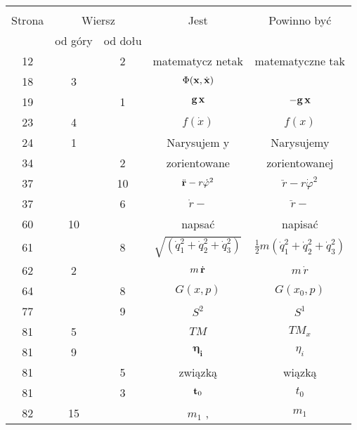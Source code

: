 \documentclass[a4paper,11pt]{article}
\begin{document}
\begin{center}

  \begin{tabular}{|c|c|c|c|c|}
    \hline
    & \multicolumn{2}{c|}{} & & \\
    Strona & \multicolumn{2}{c|}{Wiersz} & Jest
                              & Powinno być \\ \cline{2-3}
    & od góry & od dołu & & \\
    \hline
    12  & &  2 & matematycz netak & matematyczne tak \\
    18  &  3 & & $\Phi( \mathbf{x}, \dot{ \mathbf{x} } )$
           & %
    \\
    19  & &  1 & $\mathbf{g}\, \mathbf{x}$ & $-\mathbf{g}\, \mathbf{x}$ \\
    23  &  4 & & $f( \dot{ x } )$ & $f( x )$ \\
    24  &  1 & & Narysujem y & Narysujemy \\
    34  & &  2 & zorientowane & zorientowanej \\
    37  & & 10 & $\ddot{ \mathbf{r} } - r \dot{ \varphi }^{ 2 }$
           & $\ddot{ r } - r \dot{ \varphi }^{ 2 }$ \\
    37  & &  6 & $\dot{ r } -$ & $\ddot{ r } -$ \\
    60  & 10 & & napsać & napisać \\
    61  & &  8 & $\sqrt{ ( \dot{ q }_{ 1 }^{ 2 } + \dot{ q }_{ 2 }^{ 2 }
                 + \dot{ q }_{ 3 }^{ 2 } ) }$
           & $\frac{ 1 }{ 2 } m ( \dot{ q }_{ 1 }^{ 2 } + \dot{ q }_{ 2 }^{ 2 }
             + \dot{ q }_{ 3 }^{ 2 } )$ \\
    62  &  2 & & $m\, \dot{ \mathbf{r} }$ & $m\, \dot{ r }$ \\
    64  & &  8 & $G( x, p )$ & $G( x_{ 0 }, p )$ \\
    77  & &  9 & $S^{ 2 }$ & $S^{ 1 }$ \\
    81  &  5 & & $TM$ & $TM_{ x }$ \\
    81  &  9 & & $\mathbf{ \eta_{ i } }$ & $\eta_{ i }$ \\
    81  & &  5 & związką & wiązką \\
    81  & &  3 & $\mathbf{t}_{ 0 }$ & $t_{ 0 }$ \\
    82  & 15 & & $m_{ 1 }${  }, & $m_{ 1 }$ \\

\end{tabular}
\end{center}
\end{document}
